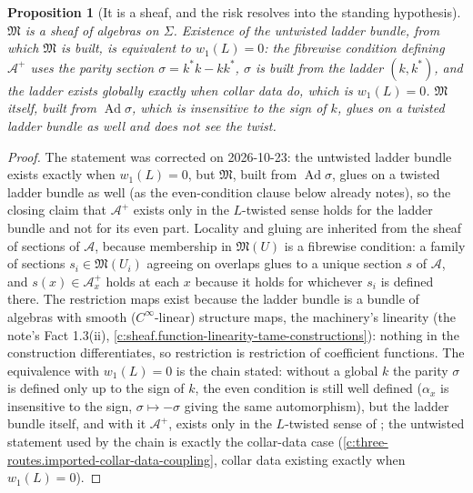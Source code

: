 \documentclass[11pt]{article}
\newtheorem{proposition}[theorem]{Proposition}
\theoremstyle{definition}
\theoremstyle{plain}
\providecommand{\Aa}{}\renewcommand{\Aa}{\mathcal{A}}
\providecommand{\Sig}{}\renewcommand{\Sig}{\Sigma}
\providecommand{\shL}{}\renewcommand{\shL}{L}
\begin{document}
\begin{proposition}[It is a sheaf, and the risk resolves into the standing hypothesis]\label{c:three-routes.it-sheaf-risk-resolves-into-standing}
$\mathfrak{M}$ is a sheaf of algebras on $\Sig$. Existence of the untwisted ladder bundle, from which $\mathfrak{M}$ is built, is equivalent to $w_1(\shL) = 0$: the fibrewise condition defining $\Aa^{+}$ uses the parity section $\sigma = k^{*}k - kk^{*}$, $\sigma$ is built from the ladder $(k, k^{*})$, and the ladder exists globally exactly when collar data do, which is $w_1(\shL) = 0$. $\mathfrak{M}$ itself, built from $\operatorname{Ad}\sigma$, which is insensitive to the sign of $k$, glues on a twisted ladder bundle as well and does not see the twist.
\end{proposition}
\begin{proof}
The statement was corrected on 2026-10-23: the untwisted ladder bundle exists exactly when $w_1(\shL) = 0$, but $\mathfrak{M}$, built from $\operatorname{Ad}\sigma$, glues on a twisted ladder bundle as well (as the even-condition clause below already notes), so the closing claim that $\Aa^{+}$ exists only in the $\shL$-twisted sense holds for the ladder bundle and not for its even part. Locality and gluing are inherited from the sheaf of sections of $\Aa$, because membership in $\mathfrak{M}(U)$ is a fibrewise condition: a family of sections $s_i \in \mathfrak{M}(U_i)$ agreeing on overlaps glues to a unique section $s$ of $\Aa$, and $s(x) \in \Aa_x^{+}$ holds at each $x$ because it holds for whichever $s_i$ is defined there. The restriction maps exist because the ladder bundle is a bundle of algebras with smooth ($C^\infty$-linear) structure maps, the machinery's linearity (the note's Fact 1.3(ii), \ref{c:sheaf.function-linearity-tame-constructions}): nothing in the construction differentiates, so restriction is restriction of coefficient functions. The equivalence with $w_1(\shL) = 0$ is the chain stated: without a global $k$ the parity $\sigma$ is defined only up to the sign of $k$, the even condition is still well defined ($\alpha_x$ is insensitive to the sign, $\sigma \mapsto -\sigma$ giving the same automorphism), but the ladder bundle itself, and with it $\Aa^{+}$, exists only in the $\shL$-twisted sense of \cite[\S 4]{ButlerT4}; the untwisted statement used by the chain is exactly the collar-data case (\ref{c:three-routes.imported-collar-data-coupling}, collar data existing exactly when $w_1(\shL) = 0$).

\end{proof}
\end{document}
